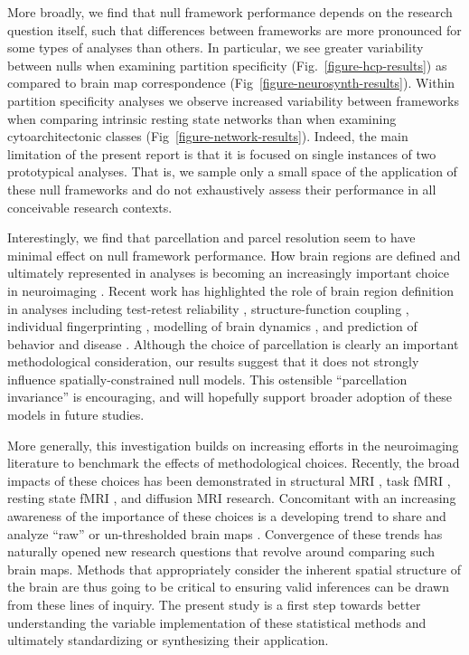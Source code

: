 \documentclass[12pt,aps,pra,reprint,showkeys]{revtex4-1}
\begin{document}
More broadly, we find that null framework performance depends on the research question itself, such that differences between frameworks are more pronounced for some types of analyses than others.
In particular, we see greater variability between nulls when examining partition specificity (Fig.~\ref{figure-hcp-results}) as compared to brain map correspondence (Fig~\ref{figure-neurosynth-results}).
Within partition specificity analyses we observe increased variability between frameworks when comparing intrinsic resting state networks than when examining cytoarchitectonic classes (Fig~\ref{figure-network-results}).
Indeed, the main limitation of the present report is that it is focused on single instances of two prototypical analyses.
That is, we sample only a small space of the application of these null frameworks and do not exhaustively assess their performance in all conceivable research contexts.

Interestingly, we find that parcellation and parcel resolution seem to have minimal effect on null framework performance.
How brain regions are defined and ultimately represented in analyses is becoming an increasingly important choice in neuroimaging \citep{eickhoff2018natrevneuro}.
Recent work has highlighted the role of brain region definition in analyses including test-retest reliability \citep{arslan2018neuroimage}, structure-function coupling \citep{messe2020hbm, vazquezrodriguez2019pnas}, individual fingerprinting \citep{finn2015natneuro}, modelling of brain dynamics \citep{proix2016neuroimage}, and prediction of behavior and disease \citep{kong2019spatial, dadi2020neuroimage}.
Although the choice of parcellation is clearly an important methodological consideration, our results suggest that it does not strongly influence spatially-constrained null models.
This ostensible ``parcellation invariance'' is encouraging, and will hopefully support broader adoption of these models in future studies.

More generally, this investigation builds on increasing efforts in the neuroimaging literature to benchmark the effects of methodological choices.
Recently, the broad impacts of these choices has been demonstrated in structural MRI \citep{bhagwat2020biorxiv, kharabian2020influence}, task fMRI \citep{carp2012plurality, botviniknesser2020nature}, resting state fMRI \citep{parkes2018neuroimage, ciric2017neuroimage}, and diffusion MRI \citep{oldham2020biorxiv, maier2017natcomm, schilling2019neuroimage} research.
Concomitant with an increasing awareness of the importance of these choices is a developing trend to share and analyze ``raw'' or un-thresholded brain maps \citep{gorgolewski2015neurovault, witt2020biorxiv}.
Convergence of these trends has naturally opened new research questions that revolve around comparing such brain maps.
Methods that appropriately consider the inherent spatial structure of the brain are thus going to be critical to ensuring valid inferences can be drawn from these lines of inquiry.
The present study is a first step towards better understanding the variable implementation of these statistical methods and ultimately standardizing or synthesizing their application.
\end{document}
